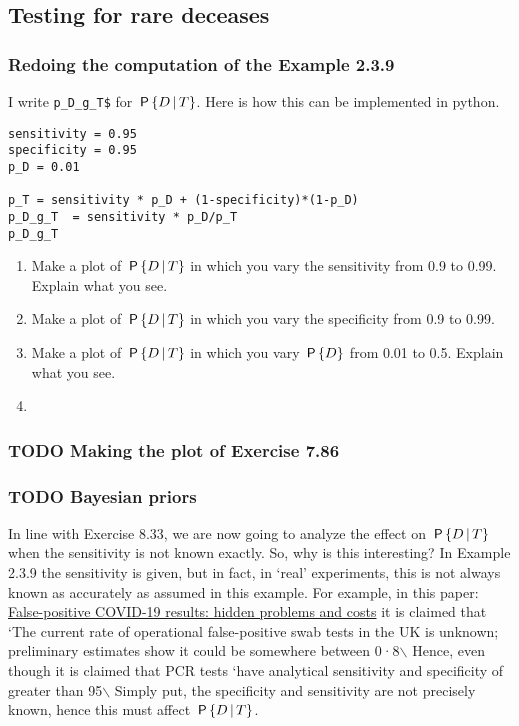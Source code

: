 \documentclass[a4paper]{article}
\begin{document}
\subsection{Testing for rare deceases}
\label{sec:orgb704f64}

\subsubsection{Redoing the  computation of the  Example 2.3.9}
\label{sec:orge3a48cf}

I write \texttt{p\_D\_g\_T\$} for \(\P{D\given T}\). Here is how this can be implemented in python.

\begin{verbatim}
sensitivity = 0.95
specificity = 0.95
p_D = 0.01

p_T = sensitivity * p_D + (1-specificity)*(1-p_D)
p_D_g_T  = sensitivity * p_D/p_T
p_D_g_T
\end{verbatim}

\begin{enumerate}
\item Make a plot of \(\P{D\given T}\) in which you vary the sensitivity from 0.9 to 0.99. Explain what you see.
\item Make a plot of \(\P{D\given T}\) in which you vary the specificity from 0.9 to 0.99.
\item Make a plot of \(\P{D\given T}\) in which you vary \(\P{D}\) from 0.01 to 0.5. Explain what you see.
\item 
\end{enumerate}



\subsubsection{{\bfseries\sffamily TODO} Making the plot of Exercise 7.86}
\label{sec:orgf534b47}

\subsubsection{{\bfseries\sffamily TODO} Bayesian priors}
\label{sec:orgac48e35}

In line with Exercise 8.33, we are now going to analyze the effect on \(\P{D\given T}\) when the sensitivity is not known exactly.
So, why is this interesting?
In Example 2.3.9 the sensitivity is given, but in fact, in `real' experiments, this is not always known as accurately as assumed in this example.
For example, in this paper: \href{https://www.thelancet.com/journals/lanres/article/PIIS2213-2600(20)30453-7/fulltext}{False-positive COVID-19 results: hidden problems and costs} it is claimed that `The current rate of operational false-positive swab tests in the UK is unknown; preliminary estimates show it could be somewhere between 0·8$\backslash$%
Hence, even though it is claimed that PCR tests `have analytical sensitivity and specificity of greater than 95$\backslash$%
Simply put, the specificity and sensitivity are not precisely known, hence this must affect \(\P{D\given T}\).
\end{document}
